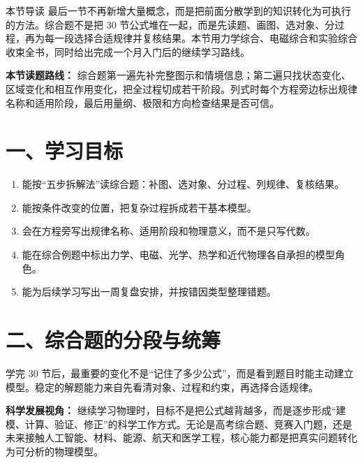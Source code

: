 
\begin{learningbox}{本节导读}
最后一节不再新增大量概念，而是把前面分散学到的知识转化为可执行的方法。综合题不是把 30 节公式堆在一起，而是先读题、画图、选对象、分过程，再为每一段选择合适规律并复核结果。本节用力学综合、电磁综合和实验综合收束全书，同时给出完成一个月入门后的继续学习路线。
\end{learningbox}

\textbf{本节读题路线：} 综合题第一遍先补完整图示和情境信息；第二遍只找状态变化、区域变化和相互作用变化，把全过程切成若干阶段。列式时每个方程旁边标出规律名称和适用阶段，最后用量纲、极限和方向检查结果是否可信。

\section*{一、学习目标}
\begin{enumerate}
  \item 能按“五步拆解法”读综合题：补图、选对象、分过程、列规律、复核结果。
  \item 能按条件改变的位置，把复杂过程拆成若干基本模型。
  \item 会在方程旁写出规律名称、适用阶段和物理意义，而不是只写代数。
  \item 能在综合例题中标出力学、电磁、光学、热学和近代物理各自承担的模型角色。
  \item 能为后续学习写出一周复盘安排，并按错因类型整理错题。
\end{enumerate}
\section*{二、综合题的分段与统筹}

学完 30 节后，最重要的变化不是“记住了多少公式”，而是看到题目时能主动建立模型。稳定的解题能力来自先看清对象、过程和约束，再选择合适规律。

\textbf{科学发展视角：} 继续学习物理时，目标不是把公式越背越多，而是逐步形成“建模、计算、验证、修正”的科学工作方式。无论是高考综合题、竞赛入门题，还是未来接触人工智能、材料、能源、航天和医学工程，核心能力都是把真实问题转化为可分析的物理模型。

\begin{center}


\label{fig:comprehensive-solving-flow}
\end{center}

